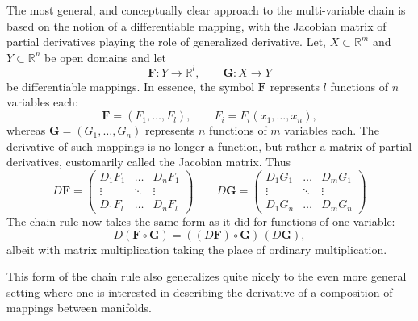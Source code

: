 \documentclass[12pt]{article}
\newcommand{\vF}{\mathbf{F}}
\newcommand{\vG}{\mathbf{G}}
\newcommand{\reals}{\mathbb{R}}
\begin{document}
The most general, and conceptually clear approach to the
multi-variable chain is based on the notion of a differentiable
mapping, with the Jacobian matrix of partial derivatives playing the
role of generalized derivative.  Let, $X\subset\reals^m$ and
$Y\subset\reals^n$ be open domains and let
$$\vF:Y\rightarrow\reals^l,\qquad \vG:X\rightarrow Y$$
be differentiable mappings.  In essence, the symbol $\vF$ represents
$l$ functions of $n$ variables each:
$$\vF = (F_1,\ldots,F_l),\qquad F_i=F_i(x_1,\ldots,x_n),$$
whereas
$\vG=(G_1,\ldots,G_n)$ represents $n$ functions of $m$ variables each.
The derivative of such mappings is no longer a function, but rather a
matrix of partial derivatives, customarily called the Jacobian matrix.
Thus
$$
D\vF = 
\begin{pmatrix}
  D_1 F_1 & \ldots & D_n F_1 \\
  \vdots & \ddots & \vdots \\
  D_1 F_l & \ldots & D_n F_l
\end{pmatrix}
\qquad
D\vG = 
\begin{pmatrix}
  D_1 G_1 & \ldots & D_m G_1 \\
  \vdots & \ddots & \vdots \\
  D_1 G_n & \ldots & D_m G_n
\end{pmatrix}
$$
The chain rule now takes the same form as it did for functions of one
variable:
$$D(\vF\circ \vG) = ((D\vF) \circ \vG)\, (D\vG),$$
albeit with matrix
multiplication taking the place of ordinary multiplication.

This form of the chain rule also generalizes quite nicely to the even
more general setting where one is interested in describing the
derivative of a composition of mappings between manifolds.
\end{document}
